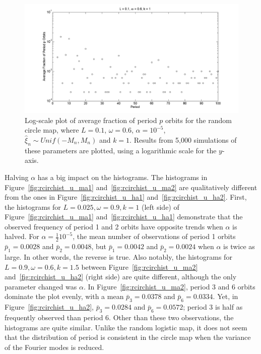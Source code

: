 \begin{figure}[H]\linespread{1}
\caption[Log-scale plot of average fraction of period $p$ orbits for the random circle
map (uniform distribution), for $\alpha=10^{-5}$, $\omega=0.6$ and
$k=1$]{Log-scale plot of average fraction of period $p$ orbits for the random circle map,
  where $L=0.1$, $\omega =0.6$, $\alpha = 10^{-5}$, $\hat{\xi}_n\sim
  Unif(-M_n,M_n)$ and $k=1$. Results from 5,000 simulations of these
  parameters are plotted, using a logarithmic scale for the
  $y$-axis.}\label{fig:avgcircorbs}
	\begin{center}		\includegraphics[width=.8\textwidth]{figs/rcirc_avg_num_1000_sim_logscale.png}
	\end{center}
\end{figure}

Halving $\alpha$ has a big impact on the histograms. The histograms in
Figure~\ref{fig:rcirchist_u_ma1} and~\ref{fig:rcirchist_u_ma2} are
qualitatively different from the ones in Figure~\ref{fig:rcirchist_u_ha1}
and~\ref{fig:rcirchist_u_ha2}. First, the histograms for $L=0.025,
\omega = 0.9, k = 1$ (left side)
of Figure~\ref{fig:rcirchist_u_ma1} and~\ref{fig:rcirchist_u_ha1} demonstrate that the observed frequency of
period 1 and 2 orbits have opposite trends when $\alpha$ is
halved. For $\alpha = \frac{1}{2}10^{-5}$, the mean number of
observations of period 1 orbits $\bar{p}_1=0.0028$ and
$\bar{p}_2=0.0048$, but $\bar{p}_1=0.0042$ and
$\bar{p}_2=0.0024$ when $\alpha$ is twice as large. In other words,
the reverse is true. Also notably, the histograms for $L=0.9, \omega = 0.6, k=1.5$ between Figure~\ref{fig:rcirchist_u_ma2}
and~\ref{fig:rcirchist_u_ha2} (right side) are quite different, although the only
parameter changed was $\alpha$. In Figure~\ref{fig:rcirchist_u_ma2},
period 3 and 6 orbits dominate the plot evenly, with a mean $\bar{p}_3=0.0378$ and $\bar{p}_6=0.0334$. Yet, in
Figure~\ref{fig:rcirchist_u_ha2}, $\bar{p}_3=0.0284$ and
$\bar{p}_6=0.0572$; period 3 is half as frequently observed than
period 6. Other than these two observations, the histograms are quite
similar. Unlike the random logistic map, it does not seem that the
distribution of period is consistent in the circle map when the
variance of the Fourier modes is reduced.  

